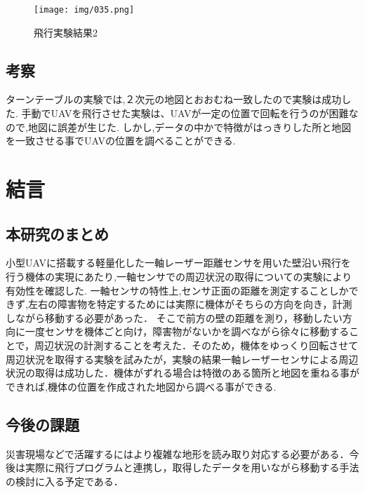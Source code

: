 \documentclass[12pt,oneside]{sotsuken_paper}
\begin{document}
\begin{figure}[H]
\begin{center}
\texttt{[image: img/035.png]}
\end{center}
\caption{飛行実験結果2}
\label{fig:035}
\end{figure}

\section{考察}
ターンテーブルの実験では,２次元の地図とおおむね一致したので実験は成功した.
手動でUAVを飛行させた実験は、UAVが一定の位置で回転を行うのが困難なので,地図に誤差が生じた.
しかし,データの中かで特徴がはっきりした所と地図を一致させる事でUAVの位置を調べることができる.



\chapter{結言}
\section{本研究のまとめ}小型UAVに搭載する軽量化した一軸レーザー距離センサを用いた壁沿い飛行を行う機体の実現にあたり,一軸センサでの周辺状況の取得についての実験により有効性を確認した.
一軸センサの特性上,センサ正面の距離を測定することしかできず,左右の障害物を特定するためには実際に機体がそちらの方向を向き，計測しながら移動する必要があった．
そこで前方の壁の距離を測り，移動したい方向に一度センサを機体ごと向け，障害物がないかを調べながら徐々に移動することで，周辺状況の計測することを考えた．そのため，機体をゆっくり回転させて周辺状況を取得する実験を試みたが，実験の結果一軸レーザーセンサによる周辺状況の取得は成功した．機体がずれる場合は特徴のある箇所と地図を重ねる事ができれば,機体の位置を作成された地図から調べる事ができる.

\section{今後の課題}災害現場などで活躍するにはより複雑な地形を読み取り対応する必要がある．今後は実際に飛行プログラムと連携し，取得したデータを用いながら移動する手法の検討に入る予定である．
\end{document}
